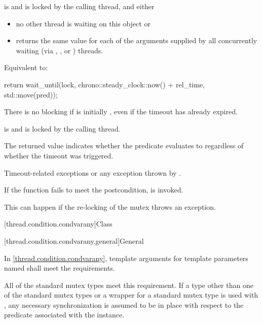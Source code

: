 \begin{itemdescr}
\pnum
\expects
{} is  and 
is locked by the calling thread, and either
\begin{itemize}
\item
no other thread is waiting on this  object or

\item
{} returns the same value for each of the  arguments
supplied by all concurrently waiting (via , , or
) threads.
\end{itemize}

\pnum
\effects
Equivalent to:
\begin{codeblock}
return wait_until(lock, chrono::steady_clock::now() + rel_time, std::move(pred));
\end{codeblock}

\pnum
\begin{note}
There is no blocking if  is initially , even if the
timeout has already expired.
\end{note}

\pnum
\ensures
{} is  and 
is locked by the calling thread.

\pnum
\begin{note}
The returned value indicates whether the predicate evaluates to 
regardless of whether the timeout was triggered.
\end{note}

\pnum
\throws
Timeout-related
exceptions or any exception thrown by .

\pnum
\remarks
If the function fails to meet the postcondition, 
is invoked.
\begin{note}
This can happen if the re-locking of the mutex throws an exception.
\end{note}
\end{itemdescr}

[thread.condition.condvarany]{Class }

[thread.condition.condvarany.general]{General}

\pnum
In \ref{thread.condition.condvarany},
template arguments for template parameters named 
shall meet the 
requirements.
\begin{note}
All of the standard
mutex types meet this requirement. If a type other than one of the
standard mutex types or a  wrapper for a standard mutex type
is used with , any
necessary synchronization is assumed to be in place with respect to the predicate associated
with the  instance.
\end{note}

